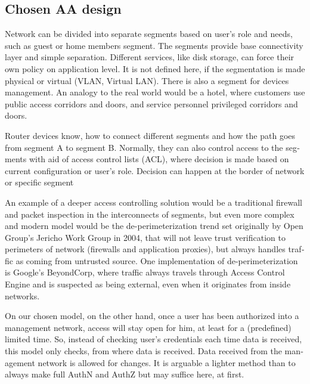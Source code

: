 \documentclass[12pt,a4paper,english]{tutthesis}
\begin{document}
\begin{otherlanguage}{english}
\section{Chosen AA design}
\label{sec-4-1}
\label{sec:chosendesign}



Network can be divided into separate segments based on user's role and
needs, such as guest or home members segment. The segments provide
base connectivity layer and simple separation. Different services,
like disk storage, can force their own policy on application level.
It is not defined here, if the segmentation is made physical or
virtual (VLAN, Virtual LAN).  There is also a segment for devices
management.  An analogy to the real world would be a hotel, where
customers use public access corridors and doors, and service personnel
privileged corridors and doors.


Router devices know, how to connect different segments and how the
path goes from segment A to segment B. Normally, they can also control
access to the segments with aid of access control lists (ACL), where
decision is made based on current configuration or user's role.
Decision can happen at the border of network or specific segment




An example of a deeper access controlling  solution would be a traditional firewall and packet
inspection in the interconnects of segments, but even more complex and modern model
would be the de-perimeterization trend set originally by Open Group's
Jericho Work Group\cite{jericho2004} in 2004, that will not leave trust verification to
perimeters of network (firewalls and application proxies), but 
always handles traffic as coming from untrusted source.
One implementation of de-perimeterization is 
Google's BeyondCorp\cite{2014-beyondcorp}, 
where traffic always travels through Access Control Engine
and is suspected as being external, even when it originates from
inside networks. 



On our chosen model, on the other hand, once a user has been authorized into a management network, access
will stay open for him, at least for a (predefined) limited time.
So, instead of checking user's credentials each time data is received,
this model only checks, from where data is received. 
Data received from the management network is allowed for changes.
It is arguable a lighter method than to always make 
full AuthN and AuthZ but may suffice here, at first.



\end{otherlanguage}
\end{document}
